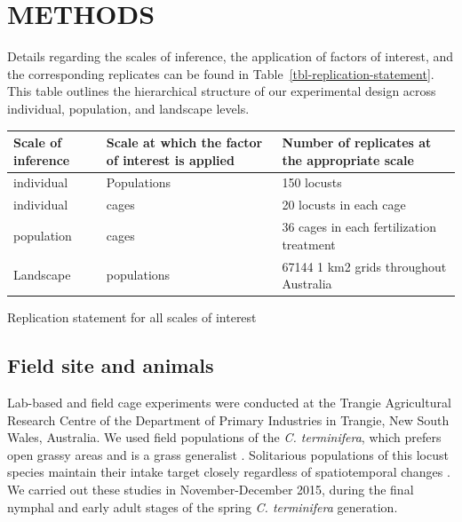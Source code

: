 \documentclass[
]{article}
\begin{document}
\section{METHODS}\label{methods}

Details regarding the scales of inference, the application of factors of
interest, and the corresponding replicates can be found in
Table~\ref{tbl-replication-statement}. This table outlines the
hierarchical structure of our experimental design across individual,
population, and landscape levels.

\begin{tbl}

\begin{minipage}{\linewidth}

\begingroup
\fontsize{12.0pt}{14.4pt}\selectfont
\begin{longtable*}{lll}
\toprule
Scale of inference & Scale at which the factor of interest is applied & Number of replicates at the appropriate scale \\ 
\midrule\addlinespace[2.5pt]
individual & Populations & 150 locusts \\ 
individual & cages & 20 locusts in each cage \\ 
population & cages & 36 cages in each fertilization treatment \\ 
Landscape & populations & 67144 1 km2 grids throughout Australia \\ 
\bottomrule
\end{longtable*}
\endgroup

\end{minipage}%

\caption{\label{tbl-replication-statement}Replication statement for all
scales of interest}

\end{tbl}%

\subsection{Field site and animals}\label{field-site-and-animals}

Lab-based and field cage experiments were conducted at the Trangie
Agricultural Research Centre of the Department of Primary Industries in
Trangie, New South Wales, Australia. We used field populations of the
\emph{C. terminifera}, which prefers open grassy areas and is a grass
generalist \citep{key_general_1945}. Solitarious populations of this
locust species maintain their intake target closely regardless of
spatiotemporal changes \citep{lawton_mismatched_2021}. We carried out
these studies in November-December 2015, during the final nymphal and
early adult stages of the spring \emph{C. terminifera} generation.
\end{document}
